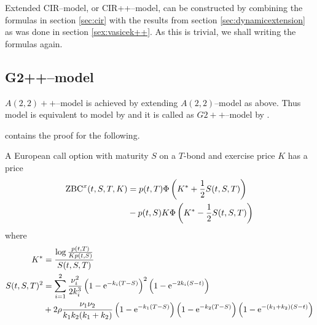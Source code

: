 Extended CIR--model, or CIR++--model, can be constructed by combining the formulas in section \ref{sec:cir} with the results from section \ref{sec:dynamicextension} as was done in section \ref{sex:vasicek++}. As this is trivial, we shall writing the formulas again.

\subsection{G2++--model}

$A(2,2)++$--model is achieved by extending $A(2,2)$--model as above. Thus model is equivalent to model by \textcite{hull1994numerical} and it is called as  $G2++$--model by \textcite{brigo2007interest}. 

\textcite[pp. 153--156, 172--173]{brigo2007interest} contains the proof for the following.

\begin{thm}
A European call option with maturity $S$ on a $T$-bond and exercise price $K$ has a price
\begin{align}
\operatorname{\mathrm{ZBC}}^x(t, S, T, K) &= p(t, T) \Phi \left( K^* + \frac{1}{2} S(t,S,T) \right) \\ 
&- p(t, S) K \Phi \left( K^* - \frac{1}{2} S(t,S,T) \right)
\end{align}
where
\begin{align}
K^* & = \frac{\log \frac{p(t,T)}{Kp(t,S)}}{S(t,S,T)} \\
S(t,S,T)^2 &= \sum_{i=1}^2 \frac{\nu_i^2}{2 k_i^3} \left( 1 - \mathrm{e}^{ -k_i(T-S) } \right)^2 \left( 1 - \mathrm{e}^{-2k_i(S-t)} \right) \\
&+ 2 \rho \frac{\nu_1 \nu_2}{ k_1 k_2 (k_1 + k_2) }  \left( 1 - \mathrm{e}^{ -k_1(T-S) } \right)  \left( 1 - \mathrm{e}^{ -k_2(T-S) } \right)  \left( 1 - \mathrm{e}^{ -(k_1 + k_2)(S-t) } \right)
\end{align}
\end{thm}